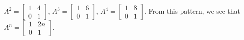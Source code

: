 $A^2 = \begin{bmatrix}1 & 4\\ 0 & 1\end{bmatrix}$, 
$A^3 = \begin{bmatrix}1 & 6\\ 0 & 1\end{bmatrix}$, 
$A^4 = \begin{bmatrix}1 & 8\\ 0 & 1\end{bmatrix}$.  
From this pattern, we see that 
$A^n = \begin{bmatrix}1 & 2n\\ 0 & 1\end{bmatrix}$.